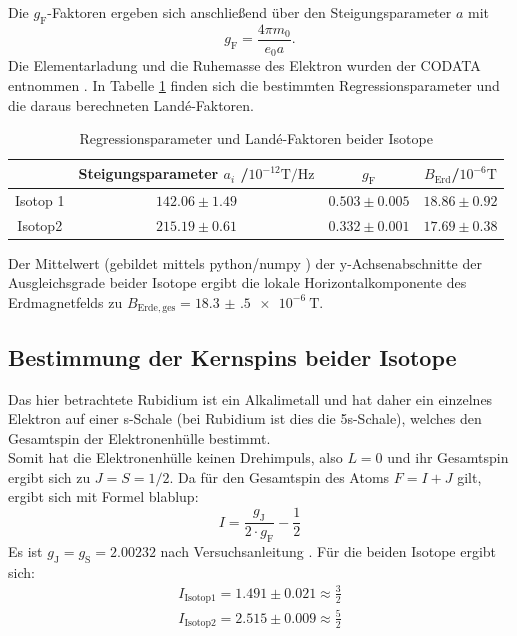 Die $g_{\mathrm{F}}$-Faktoren ergeben sich anschließend über den Steigungsparameter $a$ mit
\begin{equation*}
  g_{\mathrm{F}}=\frac{4\pi m_0}{e_0 a}\mathrm{.}
\end{equation*}
Die Elementarladung und die Ruhemasse des Elektron wurden der CODATA entnommen \cite{e} \cite{m_0}.
In Tabelle \ref{tab:res1} finden sich die bestimmten Regressionsparameter und die daraus berechneten Landé-Faktoren.
\begin{table}
  \caption{Regressionsparameter und Landé-Faktoren beider Isotope}
  \label{tab:res1}
 \centering
 \begin{tabular}{cccc}
   \toprule
&Steigungsparameter $a_i$ /$ 10^{-12}\si{\tesla\per\hertz}$&$g_{\mathrm{F}}$&$B_{\mathrm{Erd}}$/$10^{-6}\si{\tesla}$\\
\midrule
Isotop 1&$142.06\pm1.49$&$0.503\pm0.005$&$18.86\pm0.92$\\
Isotop2&$215.19\pm0.61$&$0.332\pm0.001$ &$17.69\pm0.38$\\
\bottomrule
\end{tabular}
\end{table}
Der Mittelwert (gebildet mittels python/numpy \cite{numpy}) der y-Achsenabschnitte der Ausgleichsgrade beider Isotope ergibt die lokale Horizontalkomponente des Erdmagnetfelds zu $B_{\mathrm{Erde,ges}}=\SI{18.3(5)e-6}{\tesla}$.




\subsection{Bestimmung der Kernspins beider Isotope}
Das hier betrachtete Rubidium ist ein Alkalimetall und hat daher ein einzelnes Elektron auf einer s-Schale (bei Rubidium ist dies die 5s-Schale), welches den Gesamtspin der Elektronenhülle bestimmt.\\
Somit hat die Elektronenhülle keinen Drehimpuls, also $L=0$ und ihr Gesamtspin ergibt sich zu $J=S=1/2$. Da für den Gesamtspin des Atoms $F=I+J$ gilt, ergibt sich mit Formel blablup:
\begin{equation*}
I=\frac{g_{\mathrm{J}}}{2\cdot g_{\mathrm{F}}}-\frac{1}{2}
\end{equation*}
Es ist $g_{\mathrm{J}}=g_{\mathrm{S}}=2.00232$ nach Versuchsanleitung \cite{Anleitung}.
Für die beiden Isotope ergibt sich:
\begin{gather*}
  I_{\mathrm{Isotop 1}}=1.491\pm0.021\approx\frac{3}{2}\\
  I_{\mathrm{Isotop 2}}=2.515\pm0.009\approx\frac{5}{2}\\
\end{gather*}


